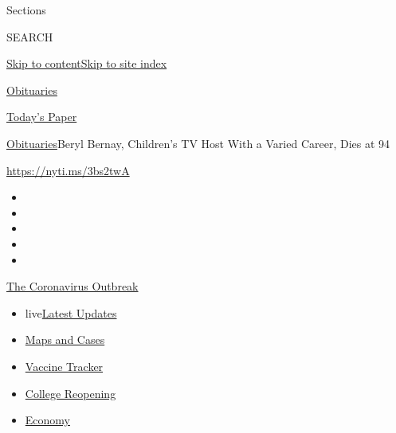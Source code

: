 Sections

SEARCH

\protect\hyperlink{site-content}{Skip to
content}\protect\hyperlink{site-index}{Skip to site index}

\href{https://www.nytimes.com/section/obituaries}{Obituaries}

\href{https://myaccount.nytimes.com/auth/login?response_type=cookie\&client_id=vi}{}

\href{https://www.nytimes.com/section/todayspaper}{Today's Paper}

\href{/section/obituaries}{Obituaries}\textbar{}Beryl Bernay, Children's
TV Host With a Varied Career, Dies at 94

\url{https://nyti.ms/3bs2twA}

\begin{itemize}
\item
\item
\item
\item
\item
\end{itemize}

\href{https://www.nytimes.com/news-event/coronavirus?action=click\&pgtype=Article\&state=default\&region=TOP_BANNER\&context=storylines_menu}{The
Coronavirus Outbreak}

\begin{itemize}
\tightlist
\item
  live\href{https://www.nytimes.com/2020/08/03/world/coronavirus-covid-19.html?action=click\&pgtype=Article\&state=default\&region=TOP_BANNER\&context=storylines_menu}{Latest
  Updates}
\item
  \href{https://www.nytimes.com/interactive/2020/us/coronavirus-us-cases.html?action=click\&pgtype=Article\&state=default\&region=TOP_BANNER\&context=storylines_menu}{Maps
  and Cases}
\item
  \href{https://www.nytimes.com/interactive/2020/science/coronavirus-vaccine-tracker.html?action=click\&pgtype=Article\&state=default\&region=TOP_BANNER\&context=storylines_menu}{Vaccine
  Tracker}
\item
  \href{https://www.nytimes.com/2020/08/02/us/covid-college-reopening.html?action=click\&pgtype=Article\&state=default\&region=TOP_BANNER\&context=storylines_menu}{College
  Reopening}
\item
  \href{https://www.nytimes.com/live/2020/08/03/business/stock-market-today-coronavirus?action=click\&pgtype=Article\&state=default\&region=TOP_BANNER\&context=storylines_menu}{Economy}
\end{itemize}

